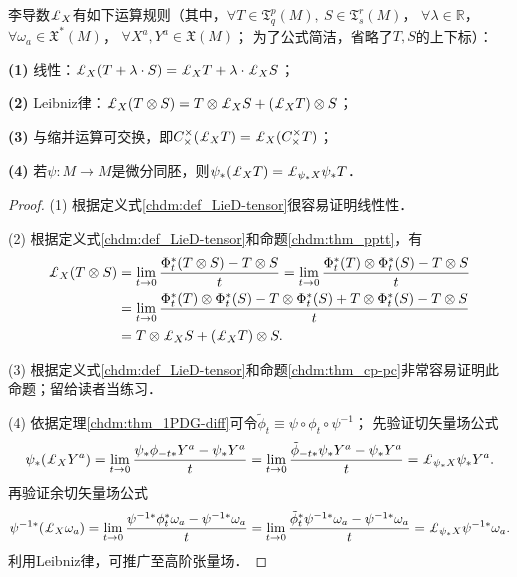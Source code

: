 \begin{theorem}\label{chdm:thm_LieD-property}
    李导数$\Lie_{X}$有如下运算规则（其中，$\forall T\in \mathfrak{T}^p_q(M),\ S\in \mathfrak{T}^r_s(M)$，
    $\forall \lambda \in \mathbb{R}$， $\forall \omega_a\in \mathfrak{X}^*(M)$，
    $\forall X^a,Y^a\in \mathfrak{X}(M)$；
    为了公式简洁，省略了$T,S$的上下标）：
    
    {\bfseries (1)} 线性：$\Lie_{X}(T + \lambda \cdot S) = \Lie_{X}T + \lambda\cdot \Lie_{X}S$；
    
    {\bfseries (2)} Leibniz律：$\Lie_{X} (T \otimes S) = T \otimes \Lie_{X} S + (\Lie_{X} T )\otimes S$；
    
    {\bfseries (3)} 与缩并运算可交换，即$C^\times_\times (\Lie_{X} T) =  \Lie_{X} (C^\times_\times T) $；
    
    
    
    {\bfseries (4)} 若$\psi:M\to M$是微分同胚，则$\psi_*(\Lie_{X} T) = \Lie_{\psi_*X} \psi_* T$．
\end{theorem}
\begin{proof}
    (1) 根据定义式\eqref{chdm:def_LieD-tensor}很容易证明线性性．
    
    (2) 根据定义式\eqref{chdm:def_LieD-tensor}和命题\ref{chdm:thm_pptt}，有
    \begin{align*}
        \Lie_{X} (T \otimes S) & = \lim_{t\to 0} \frac{\Phi^{*}_{t} (T\otimes S) -T\otimes S }{t} 
          = \lim_{t\to 0} \frac{\Phi^{*}_{t} (T)\otimes \Phi^{*}_{t}(S) -T\otimes S }{t}\\
        & = \lim_{t\to 0} \frac{\Phi^{*}_{t} (T)\otimes \Phi^{*}_{t}(S) 
             -T\otimes \Phi^{*}_{t}(S) +T\otimes \Phi^{*}_{t}(S) -T\otimes S }{t} \\
        & = T \otimes \Lie_{X} S + (\Lie_{X} T )\otimes S .
    \end{align*}

    (3) 根据定义式\eqref{chdm:def_LieD-tensor}和命题\ref{chdm:thm_cp-pc}非常容易证明此命题；留给读者当练习．


    (4) 依据定理\ref{chdm:thm_1PDG-diff}可令$\tilde{\phi}_t \equiv \psi \circ \phi_t \circ \psi^{-1}$；
    先验证切矢量场公式
    \begin{equation*}
        \psi_*(\Lie_{X} Y^a)  = \lim_{t\to 0} \frac{\psi_*{\phi}_{-t*} Y^a - \psi_*Y^a }{t} 
       = \lim_{t\to 0} \frac{\tilde{\phi}_{-t*} \psi_*Y^a -\psi_*Y^a }{t} 
       =\Lie_{\psi_*X} \psi_*Y^a .
    \end{equation*}
    再验证余切矢量场公式
    \begin{align*}
        \psi^{-1*}(\Lie_{X} \omega_a)  = \lim_{t\to 0} \frac{\psi^{-1*} {\phi}_{t}^{*} 
            \omega_a - \psi^{-1*}\omega_a }{t} 
        = \lim_{t\to 0} \frac{ \tilde{\phi}_{t}^{*} \psi^{-1*}\omega_a - \psi^{-1*}\omega_a }{t} 
        =\Lie_{\psi_*X} \psi^{-1*}\omega_a  .
    \end{align*}
    利用Leibniz律，可推广至高阶张量场．
\end{proof}

